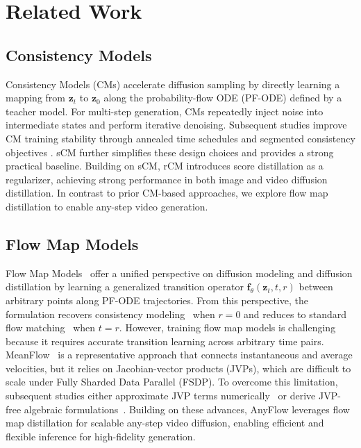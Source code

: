 \section{Related Work}
\label{sec:related_work}

\subsection{Consistency Models}
Consistency Models (CMs) \cite{song2023consistency} accelerate diffusion sampling by directly learning a mapping from $\mathbf{z}_t$ to $\mathbf{z}_0$ along the probability-flow ODE (PF-ODE) defined by a teacher model. For multi-step generation, CMs repeatedly inject noise into intermediate states and perform iterative denoising. Subsequent studies improve CM training stability through annealed time schedules \cite{song2024improved, geng2024consistency} and segmented consistency objectives \cite{wang2024phased, ren2024hyper, lee2024truncated}. sCM \cite{lu2024simplifying} further simplifies these design choices and provides a strong practical baseline. Building on sCM, rCM \cite{zheng2025large} introduces score distillation as a regularizer, achieving strong performance in both image and video diffusion distillation. In contrast to prior CM-based approaches, we explore flow map distillation to enable any-step video generation.


\subsection{Flow Map Models}
Flow Map Models~\cite{boffi2024flow, sabour2025align, kim2024consistency} offer a unified perspective on diffusion modeling and diffusion distillation by learning a generalized transition operator $\mathbf{f}_\theta(\mathbf{z}_t, t, r)$ between arbitrary points along PF-ODE trajectories. From this perspective, the formulation recovers consistency modeling~\cite{song2023consistency} when $r=0$ and reduces to standard flow matching~\cite{liu2022flow, lipman2022flow} when $t=r$. However, training flow map models is challenging because it requires accurate transition learning across arbitrary time pairs. MeanFlow~\cite{geng2025mean} is a representative approach that connects instantaneous and average velocities, but it relies on Jacobian-vector products (JVPs), which are difficult to scale under Fully Sharded Data Parallel (FSDP). To overcome this limitation, subsequent studies either approximate JVP terms numerically~\cite{wang2025transition} or derive JVP-free algebraic formulations~\cite{luo2025soflow, guo2025splitmeanflow}. Building on these advances, AnyFlow leverages flow map distillation for scalable any-step video diffusion, enabling efficient and flexible inference for high-fidelity generation.

